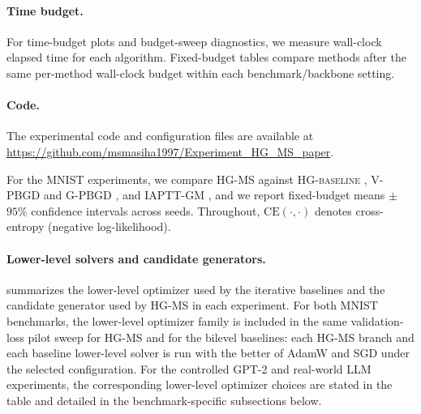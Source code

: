\documentclass{article}
\theoremstyle{normaltheorem}
\begin{document}
\paragraph{Time budget.}
For time-budget plots and budget-sweep diagnostics, we measure wall-clock elapsed time for each algorithm. Fixed-budget
tables compare methods after the same per-method wall-clock budget within each benchmark/backbone setting.
\paragraph{Code.}
The experimental code and configuration files are available at
\url{https://github.com/msmasiha1997/Experiment_HG_MS_paper}.


For the MNIST experiments, we compare \textsc{HG-MS} against
\textsc{HG-baseline} \citep{lorraine2020optimizing}, V-PBGD and G-PBGD \citep{kwon2023penalty,shen2023penalty}, and
IAPTT-GM \citep{xiao2023generalized,shaban2019truncated}, and we report fixed-budget means $\pm$ $95\%$ confidence
intervals across seeds. Throughout, $\mathrm{CE}(\cdot,\cdot)$ denotes cross-entropy (negative log-likelihood).

\paragraph{Lower-level solvers and candidate generators.}
 summarizes the lower-level optimizer used by the iterative baselines and the candidate
generator used by \textsc{HG-MS} in each experiment. For both MNIST benchmarks, the lower-level optimizer family is
included in the same validation-loss pilot sweep for \textsc{HG-MS} and for the bilevel baselines: each \textsc{HG-MS}
branch and each baseline lower-level solver is run with the better of AdamW and SGD under the selected configuration. For the
controlled GPT-2 and real-world LLM experiments, the corresponding lower-level optimizer choices are stated in the table
and detailed in the benchmark-specific subsections below.
\end{document}
